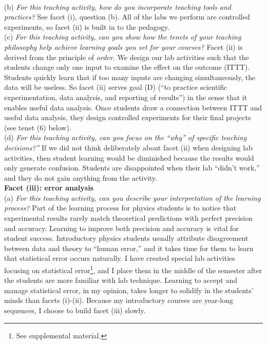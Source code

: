 \documentclass[../../../main.tex]{subfiles}
\begin{document}
\\
\vspace{0.25cm}
(b) \textit{For this teaching activity, how do you incorporate teaching tools and practices?}  See facet (i), question (b).  All of the labs we perform are controlled experiments, so facet (ii) is built in to the pedagogy.
\\
\vspace{0.25cm}
(c) \textit{For this teaching activity, can you show how the tenets of your teaching philosophy help achieve learning goals you set for your courses?}  Facet (ii) is derived from the principle of \textit{order.}  We design our lab activities such that the students change only one input to examine the effect on the outcome (ITTT).  Students quickly learn that if too many inputs are changing simultaneously, the data will be useless.  So facet (ii) serves goal (D) (``to practice scientific experimentation, data analysis, and reporting of results'') in the sense that it enables useful data analysis.  Once students draw a connection between ITTT and useful data analysis, they design controlled experiments for their final projects (see tenet (6) below).
\\
\vspace{0.25cm}
(d) \textit{For this teaching activity, can you focus on the ``why'' of specific teaching decisions?''}  If we did not think deliberately about facet (ii) when designing lab activities, then student learning would be diminished because the results would only generate confusion.  Students are disappointed when their lab ``didn't work,'' and they do not gain anything from the activity.
\\
\vspace{0.25cm}
\textbf{Facet (iii): error analysis}
\\
\vspace{0.25cm}
(a) \textit{For this teaching activity, can you describe your interpretation of the learning process?}  Part of the learning process for physics students is to notice that experimental results rarely match theoretical predictions with perfect precision and accuracy.  Learning to improve both precision and accuracy is vital for student success.  Introductory physics students usually attribute disagreement between data and theory to ``human error,'' and it takes time for them to learn that statistical error occurs naturally.  I have created special lab activities focusing on statistical error\footnote{See supplemental material.}, and I place them in the middle of the semester after the students are more familiar with lab technique.  Learning to accept and manage statistical error, in my opinion, takes longer to solidify in the students' minds than facets (i)-(ii).  Because my introductory courses are year-long sequences, I choose to build facet (iii) slowly.
\end{document}
